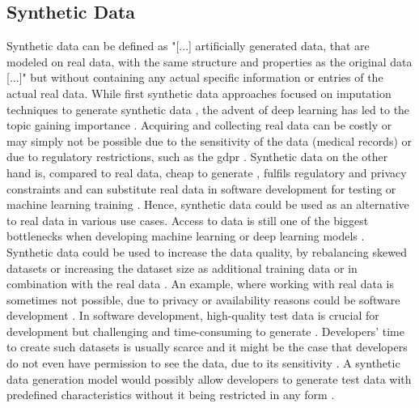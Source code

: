 \subsection{Synthetic Data}
\label{ch:preliminaries-dataSynthesis-syntheticData}
Synthetic data can be defined as "[...] artificially generated data, that are modeled on real data, with the same structure and properties as the original data [...]" \cite[p. 2]{kaloskampis2020SyntheticDataCivil} 
but without containing any actual specific information or entries of the actual real data. 
While first synthetic data approaches focused on imputation techniques to generate synthetic data \cite{gelman1992InferenceIterativeSimulation}, the advent of deep learning has led to the topic gaining importance \cite{kowalczyk2022TaxonomyUseSynthetic, kaloskampis2020SyntheticDataCivil}.
Acquiring and collecting real data can be costly \cite{panova2022HowSyntheticData} or may simply not be possible due to the sensitivity of the data (\eg medical records) \cite{esteban2017RealvaluedMedicalTimea} or due to regulatory restrictions, such as the \gls{gdpr}  \cite{european_commission_regulation_2016}.
Synthetic data on the other hand is, compared to real data, cheap to generate \cite{leminh2021AirGenGANbasedSynthetica}, fulfils regulatory and privacy constraints \cite{zhao2022CTABGANEnhancingTabular} and can substitute real data in software development for testing \cite{whiting2008CreatingRealisticScenariobased} or machine learning training \cite{panova2022HowSyntheticData}.
Hence, synthetic data could be used as an alternative to real data in various use cases.
Access to data is still one of the biggest bottlenecks when developing machine learning or deep learning models \cite{fan2020RelationalDataSynthesisa}.
Synthetic data could be used to increase the data quality, by rebalancing skewed datasets \cite{zhao2022CTABGANEnhancingTabular} 
or increasing the dataset size as additional training data or in combination with the real data \cite{leminh2021AirGenGANbasedSynthetica, kim2021OCTGANNeuralODEbased}.
An example, where working with real data is sometimes not possible, due to privacy or availability reasons could be software development \cite{9034117, whiting2008CreatingRealisticScenariobased}.
In software development, high-quality test data is crucial for development but challenging and time-consuming to generate \cite{whiting2008CreatingRealisticScenariobased}.
Developers' time to create such datasets is usually scarce and it might be the case that developers do not even have permission to see the data, due to its sensitivity \cite{whiting2008CreatingRealisticScenariobased}.
A synthetic data generation \gls{model} would possibly allow developers to generate test data with predefined characteristics without it being restricted in any form \cite{whiting2008CreatingRealisticScenariobased}.


